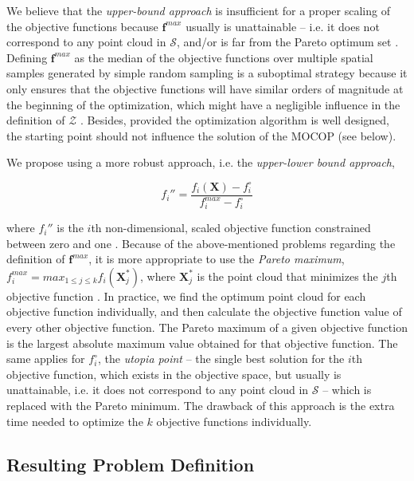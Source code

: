 We believe that the \emph{upper-bound approach} is insufficient for a proper scaling of the objective 
functions because $\boldsymbol{f}^{max}$ usually is unattainable -- i.e. it does not correspond to any point 
cloud in $\mathcal{S}$, and/or is far from the Pareto optimum set \cite{MarlerEtAl2004}. Defining 
$\boldsymbol{f}^{max}$ as the median of the objective functions over multiple spatial samples generated by 
simple random sampling \cite{CliffordEtAl2014} is a suboptimal strategy because it only ensures that the 
objective functions will have similar orders of magnitude at the beginning of the optimization, which might 
have a negligible influence in the definition of $\mathcal{Z}$ \cite{MarlerEtAl2005}. Besides, provided the 
optimization algorithm is well designed, the starting point should not influence the solution of the MOCOP 
(see below).

We propose using a more robust approach, i.e. the \emph{upper-lower bound approach},

\begin{equation}
 f_i'' = \frac{f_i(\boldsymbol{X}) - f_i^{\circ}}{f_i^{max} - f_i^{\circ}}
\end{equation}

\noindent where $f_i''$ is the $i$th non-dimensional, scaled objective function constrained between zero 
and one \cite{MarlerEtAl2005}. Because of the above-mentioned problems regarding the definition of 
$\boldsymbol{f}^{max}$, it is more appropriate to use the \emph{Pareto maximum}, $f_i^{max} = max_{1 \leq j 
\leq k} f_ i(\boldsymbol{X}_j^*)$, where $\boldsymbol{X}_j^*$ is the point cloud that minimizes the $j$th 
objective function \cite{MarlerEtAl2005}. In practice, we find the optimum point cloud for each objective 
function individually, and then calculate the objective function value of every other objective function. The 
Pareto maximum of a given objective function is the largest absolute maximum value obtained for that objective 
function. The same applies for $f_i^{\circ}$, the \emph{utopia point} -- the single best solution for the 
$i$th objective function, which exists in the objective space, but usually is unattainable, i.e. it does not 
correspond to any point cloud in $\mathcal{S}$ \cite{Arora2011} -- which is replaced with the Pareto 
minimum. The drawback of this approach is the extra time needed to optimize the $k$ objective functions 
individually.

\subsection{Resulting Problem Definition}

